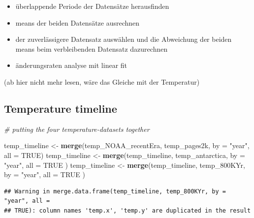 \documentclass[
]{article}
\newenvironment{Shaded}{\begin{snugshade}}{\end{snugshade}}
\newcommand{\AttributeTok}[1]{\textcolor[rgb]{0.13,0.29,0.53}{#1}}
\newcommand{\CommentTok}[1]{\textcolor[rgb]{0.56,0.35,0.01}{\textit{#1}}}
\newcommand{\ConstantTok}[1]{\textcolor[rgb]{0.56,0.35,0.01}{#1}}
\newcommand{\FunctionTok}[1]{\textcolor[rgb]{0.13,0.29,0.53}{\textbf{#1}}}
\newcommand{\NormalTok}[1]{#1}
\newcommand{\OtherTok}[1]{\textcolor[rgb]{0.56,0.35,0.01}{#1}}
\newcommand{\StringTok}[1]{\textcolor[rgb]{0.31,0.60,0.02}{#1}}
\providecommand{\tightlist}{%
  \setlength{\itemsep}{0pt}\setlength{\parskip}{0pt}}
\begin{document}
\begin{itemize}
\tightlist
\item
  überlappende Periode der Datensätze herausfinden
\item
  means der beiden Datensätze ausrechnen
\item
  der zuverlässigere Datensatz auswählen und die Abweichung der beiden
  means beim verbleibenden Datensatz dazurechnen
\item
  änderungsraten analyse mit linear fit
\end{itemize}

(ab hier nicht mehr lesen, wäre das Gleiche mit der Temperatur)

\hypertarget{temperature-timeline}{%
\subsection{Temperature timeline}\label{temperature-timeline}}

\begin{Shaded}
\begin{Highlighting}[]
\CommentTok{\# putting the four temperature{-}datasets together }

\NormalTok{temp\_timeline }\OtherTok{\textless{}{-}} \FunctionTok{merge}\NormalTok{(temp\_NOAA\_recentEra, temp\_pages2k, }\AttributeTok{by =} \StringTok{"year"}\NormalTok{, }\AttributeTok{all =} \ConstantTok{TRUE}\NormalTok{)}
\NormalTok{temp\_timeline }\OtherTok{\textless{}{-}} \FunctionTok{merge}\NormalTok{(temp\_timeline, temp\_antarctica, }\AttributeTok{by =} \StringTok{"year"}\NormalTok{, }\AttributeTok{all =} \ConstantTok{TRUE}\NormalTok{ )}
\NormalTok{temp\_timeline }\OtherTok{\textless{}{-}} \FunctionTok{merge}\NormalTok{(temp\_timeline, temp\_800KYr, }\AttributeTok{by =} \StringTok{"year"}\NormalTok{, }\AttributeTok{all =} \ConstantTok{TRUE}\NormalTok{ )}
\end{Highlighting}
\end{Shaded}

\begin{verbatim}
## Warning in merge.data.frame(temp_timeline, temp_800KYr, by = "year", all =
## TRUE): column names 'temp.x', 'temp.y' are duplicated in the result
\end{verbatim}
\end{document}
